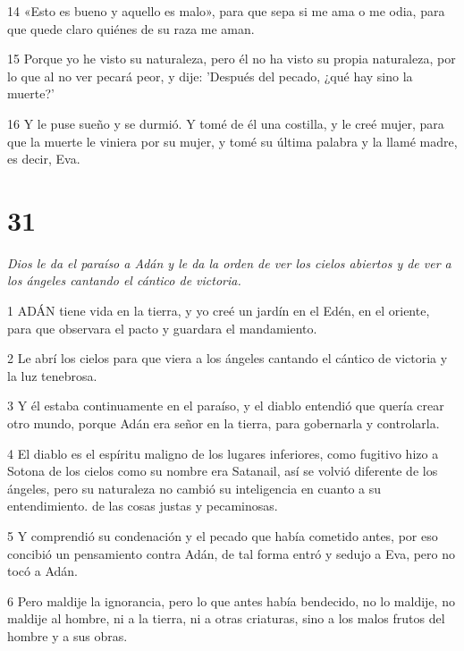 \par 14 «Esto es bueno y aquello es malo», para que sepa si me ama o me odia, para que quede claro quiénes de su raza me aman.

\par 15 Porque yo he visto su naturaleza, pero él no ha visto su propia naturaleza, por lo que al no ver pecará peor, y dije: 'Después del pecado, ¿qué hay sino la muerte?'

\par 16 Y le puse sueño y se durmió. Y tomé de él una costilla, y le creé mujer, para que la muerte le viniera por su mujer, y tomé su última palabra y la llamé madre, es decir, Eva.

\chapter{31}

\par \textit{Dios le da el paraíso a Adán y le da la orden de ver los cielos abiertos y de ver a los ángeles cantando el cántico de victoria.}

\par 1 ADÁN tiene vida en la tierra, y yo creé un jardín en el Edén, en el oriente, para que observara el pacto y guardara el mandamiento.

\par 2 Le abrí los cielos para que viera a los ángeles cantando el cántico de victoria y la luz tenebrosa.

\par 3 Y él estaba continuamente en el paraíso, y el diablo entendió que quería crear otro mundo, porque Adán era señor en la tierra, para gobernarla y controlarla.

\par 4 El diablo es el espíritu maligno de los lugares inferiores, como fugitivo hizo a Sotona de los cielos como su nombre era Satanail, así se volvió diferente de los ángeles, pero su naturaleza no cambió su inteligencia en cuanto a su entendimiento. de las cosas justas y pecaminosas.

\par 5 Y comprendió su condenación y el pecado que había cometido antes, por eso concibió un pensamiento contra Adán, de tal forma entró y sedujo a Eva, pero no tocó a Adán.

\par 6 Pero maldije la ignorancia, pero lo que antes había bendecido, no lo maldije, no maldije al hombre, ni a la tierra, ni a otras criaturas, sino a los malos frutos del hombre y a sus obras.

